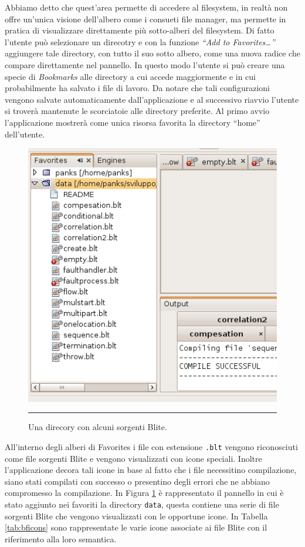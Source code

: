 Abbiamo detto che quest'area permette di accedere al filesystem, in realtà
non offre un'unica visione dell'albero come i consueti file manager, ma
permette in pratica di visualizzare direttamente più sotto-alberi del
filesystem. Di fatto l'utente può selezionare un direcotry e con la funzione \emph{``Add to
Favorites\ldots''} aggiungere tale directory, con tutto il suo sotto albero,
come una nuova radice che compare direttamente nel pannello. In questo modo l'utente
si può creare una specie di \emph{Bookmarks} alle directory a cui accede
maggiormente e in cui probabilmente ha salvato i file di lavoro. Da notare che
tali configurazioni vengono salvate automaticamente dall'applicazione e al
successivo riavvio l'utente si troverà mantenute le scorciatoie alle directory
preferite. Al primo avvio l'applicazione mostrerà come unica risorsa favorita
la directory ``home'' dell'utente.

\begin{figure}[h]
\begin{center}
\includegraphics[scale=0.65]
{blide/dia/BlideFavo}
\caption[Il pannello ``Favorites'']{Una direcory con alcuni sorgenti Blite.}
\rule{7cm}{0.01cm}
  \label{fig:blideFavo}
\end{center}
\end{figure}

All'interno degli alberi di Favorites i file con estensione
\texttt{.blt} vengono riconosciuti come file sorgenti Blite e vengono
visualizzati con icone speciali. Inoltre l'applicazione decora tali icone in
base al fatto che i file necessitino compilazione, siano stati compilati con
successo o presentino degli errori che ne abbiano compromesso la compilazione.
In Figura \ref{fig:blideFavo} è rappresentato il pannello in cui è stato aggiunto nei
favoriti la directory \texttt{data}, questa contiene una serie di file sorgenti
Blite che vengono visualizzati con le opportune icone. In Tabella
\ref{tab:bficons} sono rappresentate le varie icone associate ai file Blite con
il riferimento alla loro semantica.
\\

